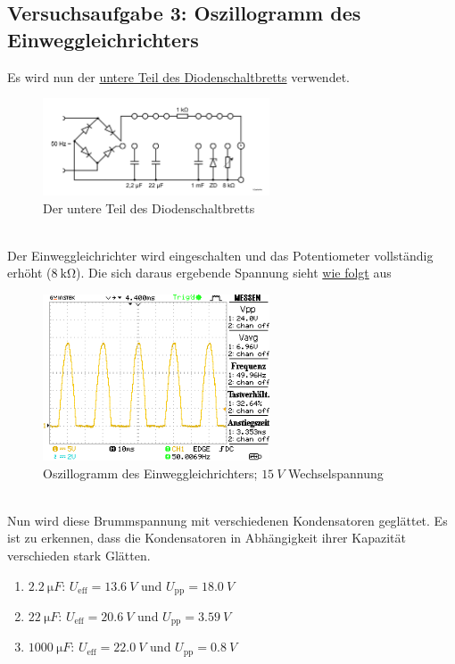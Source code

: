 \documentclass[a4paper,10pt]{article}
\numberwithin{equation}{section}
\begin{document}
\subsection{Versuchsaufgabe 3: Oszillogramm des Einweggleichrichters}
Es wird nun der \hyperref[fig:diodenschaltbrett_unten]{untere Teil des Diodenschaltbretts} verwendet.
\begin{figure}[h!]
        \centering
        \includegraphics[width=0.6\textwidth]{diodenschaltbrett_unten.png}
        \caption{Der untere Teil des Diodenschaltbretts} \label{fig:diodenschaltbrett_unten}
\end{figure}\\
Der Einweggleichrichter wird eingeschalten und das Potentiometer vollständig erhöht ($\SI{8}{\kilo \ohm}$).
Die sich daraus ergebende Spannung sieht \hyperref[fig:einweggleichrichter]{wie folgt} aus
\begin{figure}[h]
        \centering
        \includegraphics[width=0.6\textwidth]{data/a3_a.BMP.png}
        \caption{Oszillogramm des Einweggleichrichters; $\SI{15}{V}$ Wechselspannung} \label{fig:einweggleichrichter}
\end{figure}\\
Nun wird diese Brummspannung mit verschiedenen Kondensatoren geglättet.
Es ist zu erkennen, dass die Kondensatoren in Abhängigkeit ihrer Kapazität verschieden stark Glätten.
\begin{enumerate}[label=--]
        \item $\SI{2.2}{\micro F}$: $U_\text{eff}=\SI{13.6}{V}$ und $U_\text{pp}=\SI{18.0}{V}$ 
        \item $\SI{22}{\micro F}$: $U_\text{eff}=\SI{20.6}{V}$ und $U_\text{pp}=\SI{3.59}{V}$ 
        \item $\SI{1000}{\micro F}$: $U_\text{eff}=\SI{22.0}{V}$ und $U_\text{pp}=\SI{0.8}{V}$ 
\end{enumerate}
\end{document}
